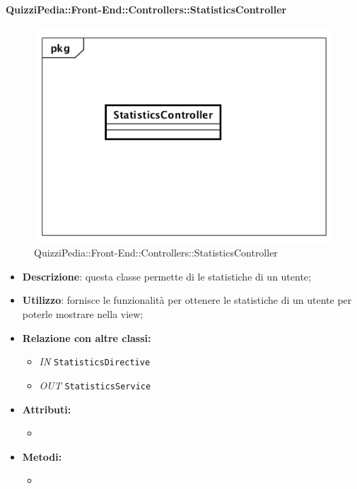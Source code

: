 \paragraph{QuizziPedia::Front-End::Controllers::StatisticsController}
\begin{figure}
	\centering
	\includegraphics[scale=0.45]{UML/Classi/Front-End/QuizziPedia_Front-end_Controller_StatisticsController.png}
	\caption{QuizziPedia::Front-End::Controllers::StatisticsController}
\end{figure}
\begin{itemize}
	\item \textbf{Descrizione}: questa classe permette di le statistiche di un utente;
	\item \textbf{Utilizzo}: fornisce le funzionalità per ottenere le statistiche di un utente per poterle mostrare nella view;
	\item \textbf{Relazione con altre classi:}
	\begin{itemize}
		\item \textit{IN} \texttt{StatisticsDirective} 
		\item \textit{OUT} \texttt{StatisticsService} 
	\end{itemize}
	\item \textbf{Attributi:}
	\begin{itemize}
		\item 
	\end{itemize}
	\item \textbf{Metodi:}
	\begin{itemize}
		\item 
	\end{itemize}
\end{itemize}


